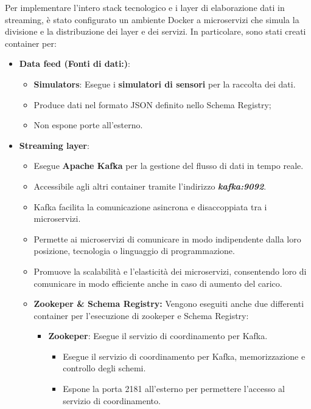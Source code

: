 Per implementare l'intero stack tecnologico e i layer di elaborazione dati in streaming, è stato configurato un ambiente Docker a microservizi che simula la divisione e la distribuzione dei layer e dei servizi. In particolare, sono stati creati container per:
\begin{itemize}
    \item \textbf{Data feed (Fonti di dati:)}:
    \begin{itemize}
        \item \textbf{Simulators}: Esegue i \textbf{simulatori di sensori} per la raccolta dei dati.
        \item Produce dati nel formato JSON definito nello Schema Registry;
        \item Non espone porte all’esterno.
    \end{itemize} 
    \item \textbf{Streaming layer}:
    \begin{itemize}
        \item Esegue \textbf{Apache Kafka} per la gestione del flusso di dati in tempo reale.
        \item Accessibile agli altri container tramite l'indirizzo \textit{\textbf{kafka:9092}}.
        \item Kafka facilita la comunicazione asincrona e disaccoppiata tra i microservizi.
        \item Permette ai microservizi di comunicare in modo indipendente dalla loro posizione, tecnologia o linguaggio di programmazione.
        \item Promuove la scalabilità e l'elasticità dei microservizi, consentendo loro di comunicare in modo efficiente anche in caso di aumento del carico.
        \item \textbf{Zookeper \& Schema Registry:} Vengono eseguiti anche due differenti container per l'esecuzione di zookeper e Schema Registry:
            \begin{itemize}
                \item \textbf{Zookeper}: Esegue il servizio di coordinamento per Kafka.
                \begin{itemize}
                    \item Esegue il servizio di coordinamento per Kafka, memorizzazione e controllo degli schemi.
                    \item Espone la porta 2181 all'esterno per permettere l'accesso al servizio di coordinamento.
                \end{itemize}

\end{itemize}
\end{itemize}
\end{itemize}
